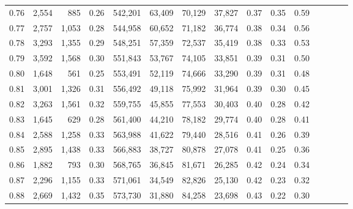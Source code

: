 \begin{tabular}{rrrcrrrrrrrrrrr}
0.76 &   2,554 &     885 &                                       0.26 &  542,201 &   63,409 &   70,129 &   37,827 &  0.37 &  0.35 &                         0.59 \\
0.77 &   2,757 &   1,053 &                                       0.28 &  544,958 &   60,652 &   71,182 &   36,774 &  0.38 &  0.34 &                         0.56 \\
0.78 &   3,293 &   1,355 &                                       0.29 &  548,251 &   57,359 &   72,537 &   35,419 &  0.38 &  0.33 &                         0.53 \\
0.79 &   3,592 &   1,568 &                                       0.30 &  551,843 &   53,767 &   74,105 &   33,851 &  0.39 &  0.31 &                         0.50 \\
0.80 &   1,648 &     561 &                                       0.25 &  553,491 &   52,119 &   74,666 &   33,290 &  0.39 &  0.31 &                         0.48 \\
0.81 &   3,001 &   1,326 &                                       0.31 &  556,492 &   49,118 &   75,992 &   31,964 &  0.39 &  0.30 &                         0.45 \\
0.82 &   3,263 &   1,561 &                                       0.32 &  559,755 &   45,855 &   77,553 &   30,403 &  0.40 &  0.28 &                         0.42 \\
0.83 &   1,645 &     629 &                                       0.28 &  561,400 &   44,210 &   78,182 &   29,774 &  0.40 &  0.28 &                         0.41 \\
0.84 &   2,588 &   1,258 &                                       0.33 &  563,988 &   41,622 &   79,440 &   28,516 &  0.41 &  0.26 &                         0.39 \\
0.85 &   2,895 &   1,438 &                                       0.33 &  566,883 &   38,727 &   80,878 &   27,078 &  0.41 &  0.25 &                         0.36 \\
0.86 &   1,882 &     793 &                                       0.30 &  568,765 &   36,845 &   81,671 &   26,285 &  0.42 &  0.24 &                         0.34 \\
0.87 &   2,296 &   1,155 &                                       0.33 &  571,061 &   34,549 &   82,826 &   25,130 &  0.42 &  0.23 &                         0.32 \\
0.88 &   2,669 &   1,432 &                                       0.35 &  573,730 &   31,880 &   84,258 &   23,698 &  0.43 &  0.22 &                         0.30 \\

\end{tabular}
